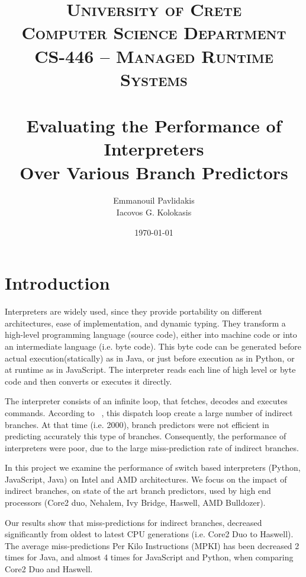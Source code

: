 \documentclass[parskip=full, paper=a4, fontsize=12pt]{scrartcl}
\title{%
\normalfont \normalsize 
\textsc{University of Crete\\
Computer Science Department \\
CS-446 -- Managed Runtime Systems} \\ [20pt] 
\horrule{0.5pt} \\[0.4cm]
\huge
Evaluating the Performance of Interpreters\\Over Various Branch Predictors
\horrule{2pt} \\[0.5cm] 
}
\author{%
    Emmanouil Pavlidakis \\
    Iacovos G. Kolokasis%
    }
\date{\normalsize\today}
\numberwithin{equation}{section}
\numberwithin{figure}{section}
\numberwithin{table}{section}
\begin{document}
\maketitle 

\section{Introduction}

Interpreters are widely used, since they provide portability on
different architectures, ease of implementation, and dynamic typing.
They transform a high-level programming language (source code), either
into machine code or into an intermediate language (i.e. byte code).
This byte code can be generated before actual execution(statically) as
in Java, or just before execution as in Python, or at runtime as in
JavaScript. The interpreter reads each line of high level or byte code
and then converts or executes it directly. 

The interpreter consists of an infinite loop, that fetches, decodes
and executes commands.  According to ~\cite{ertl2003structure}, this
dispatch loop create a large number of indirect branches. At that time
(i.e. 2000), branch predictors were not efficient in predicting
accurately this type of branches. Consequently, the performance of
interpreters were poor, due to the large miss-prediction rate of
indirect branches.  

In this project we examine the performance of switch based
interpreters (Python, JavaScript, Java) on Intel and AMD
architectures. We focus on the impact of indirect branches, on state
of the art branch predictors, used by high end processors (Core2 duo,
Nehalem, Ivy Bridge, Haswell, AMD Bulldozer).

Our results show that miss-predictions for indirect branches, decreased
significantly from oldest to latest CPU generations (i.e. Core2 Duo to
Haswell). The average miss-predictions Per Kilo Instructions (MPKI) has
been decreased 2 times for Java, and almost 4 times for JavaScript and
Python, when comparing Core2 Duo and Haswell.   

\end{document}
